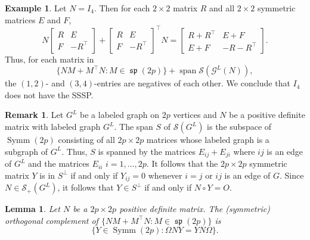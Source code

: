\documentclass[12pt]{article}
\newtheorem{lem}[thm]{Lemma}
\theoremstyle{definition}
\newtheorem{rem}[thm]{Remark}
\theoremstyle{definition}
\theoremstyle{definition}
\newtheorem{ex}[thm]{Example}
\numberwithin{figure}{section}
\numberwithin{equation}{section}
\newcommand{\Span}{\operatorname{span}}
\newcommand{\sym}{\mathcal{S}}
\newcommand{\symp}{\mathcal{S}_+}
\newcommand{\symm}{\operatorname{Symm}}
\newcommand{\spLA}{\operatorname{\mathfrak{sp}}}
\newcommand{\trans}{^{\top}}
\newcommand{\x}{\times}
\begin{document}
\begin{ex}
Let $N=I_4$.  Then  for each $2\x 2$ matrix $R$ and 
all $2\x 2$ symmetric matrices $E$ and $F$, 
\begin{equation}
\label{eq:strongex}
N \left[ \begin{array}{cc}
R & E \\ 
F & -R\trans 
\end{array} \right]
+ \left[ \begin{array}{cc}
R & E \\ 
F & -R\trans 
\end{array} \right]\trans N=
\left[ \begin{array}{cc} 
R+ R\trans & E+F \\ 
E + F & -R-R\trans 
\end{array} 
\right]. 
\end{equation} 
Thus,  for each matrix in
\[ 
\{ NM + M^\top N\colon M \in \spLA(2p)\} 
+ \Span  \mathcal{S}(\mathcal{G}^L(N)),
\]
the $(1,2)$- and $(3,4)$-entries
are negatives of each other.  We conclude that $I_4$ does not have the SSSP. 
\end{ex} 


\begin{rem}
\label{rem:Gcomp}
Let $G^L$ be a labeled graph on $2p$ vertices and $N$ be a positive definite matrix 
with labeled graph $G^L$. The span $S$ of  $\sym(G^L)$ is the subspace of 
$\symm(2p)$ consisting of all $2p\times 2p$ matrices whose labeled graph
is a subgraph of $G^L$.  Thus, $S$ is spanned by the matrices  $E_{ij} + E_{ji}$ where $ij$ is an edge of $G^L$
and the matrices $E_{ii}$ $i=1, \ldots, 2p$. 
 It follows that the $2p\times 2p$ symmetric matrix $Y$ is in $S^{\perp}$ if and only if 
$Y_{ij}=0$ whenever $i=j$ or $ij$ is an edge of $G$. Since $ N\in\symp(G^L)$, it follows 
that $Y \in S^{\perp}$ if and only if $N\circ Y=O$. 
\end{rem}


\begin{lem}\label{lem:orthocomp}
Let $N$ be a $2p \times 2p$ positive definite matrix. 
The (symmetric) orthogonal complement of 
$ \{ NM+ M\trans N\colon M \in \spLA(2p) \}$  
is 
    \[\{Y\in\symm(2p)\colon \Omega NY=YN\Omega\}.\]
\end{lem}
\end{document}
